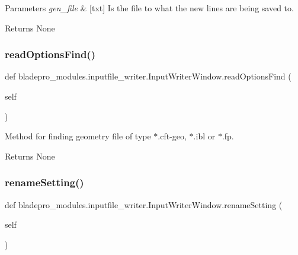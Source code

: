 \begin{DoxyParams}{Parameters}
{\em gen\+\_\+file} & \mbox{[}txt\mbox{]} Is the file to what the new lines are being saved to. \\
\hline
\end{DoxyParams}
\begin{DoxyReturn}{Returns}
None 
\end{DoxyReturn}
\hypertarget{a00070_a3b0f9f0d1af5015219f258ad0751c778}{}\label{a00070_a3b0f9f0d1af5015219f258ad0751c778} 
\subsubsection{\texorpdfstring{read\+Options\+Find()}{readOptionsFind()}}
{\footnotesize\ttfamily def bladepro\+\_\+modules.\+inputfile\+\_\+writer.\+Input\+Writer\+Window.\+read\+Options\+Find (\begin{DoxyParamCaption}\item[{}]{self }\end{DoxyParamCaption})}



Method for finding geometry file of type $\ast$.cft-\/geo, $\ast$.ibl or $\ast$.fp. 

\begin{DoxyReturn}{Returns}
None 
\end{DoxyReturn}
\hypertarget{a00070_a464a8ac16bcb67d41a6d91ee8b51acf2}{}\label{a00070_a464a8ac16bcb67d41a6d91ee8b51acf2} 
\subsubsection{\texorpdfstring{rename\+Setting()}{renameSetting()}}
{\footnotesize\ttfamily def bladepro\+\_\+modules.\+inputfile\+\_\+writer.\+Input\+Writer\+Window.\+rename\+Setting (\begin{DoxyParamCaption}\item[{}]{self }\end{DoxyParamCaption})}



